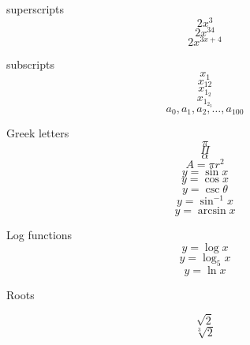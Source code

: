 \documentclass[11pt]{article}
\begin{document}
superscripts
$$2x^3$$
$$2x^{34}$$
$$2x^{3x+4}$$

subscripts
$$x_1$$
$$x_{12}$$
$$x_{1_2}$$
$$x_{1_{2_3}}$$
$$a_0, a_1, a_2, \ldots, a_{100}$$

Greek letters
$$\pi$$
$$\Pi$$
$$\alpha$$
$$A=\pi r^2$$
$$y=\sin x$$
$$y=\cos x$$
$$y=\csc \theta$$
$$y=\sin^{-1} x$$
$$y=\arcsin x$$

Log functions
$$y=\log x$$
$$y=\log_5 x$$
$$y=\ln x$$

Roots

$$\sqrt{2}$$
$$\sqrt[3]{2}$$
\end{document}

